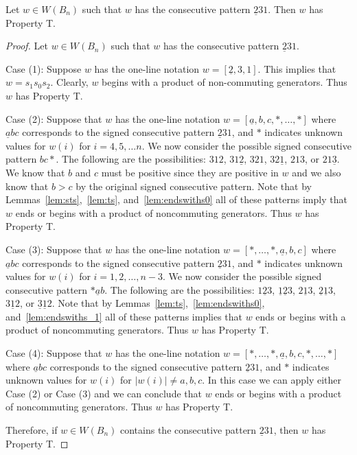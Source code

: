 \begin{lemma}\label{lem:231}
Let $w \in W(B_n)$ such that $w$ has the consecutive pattern $\underline{2}31$. Then $w$ has Property T.
\begin{proof}
	Let $w \in W(B_n)$ such that $w$ has the consecutive pattern $\underline{2}31$.
	
	Case (1): Suppose $w$ has the one-line notation $w=[\underline{2},3,1]$. This implies that $w=s_1s_0s_2$. Clearly, $w$ begins with a product of non-commuting generators. Thus $w$ has Property T.
	
	Case (2): Suppose that $w$ has the one-line notation $w=[\underline{a},b,c, \ast, \ldots, \ast]$ where $\underline{a}bc$ corresponds to the signed consecutive pattern $\underline{2}31$, and $\ast$ indicates unknown values for $w(i)$ for $i=4,5, \ldots n$. We now consider the possible signed consecutive pattern $bc \ast$. The following are the possibilities: $312$, $31\underline{2}$, $321$, $32\underline{1}$, $213$, or $21\underline{3}$. We know that $b$ and $c$ must be positive since they are positive in $w$ and we also know that $b>c$ by the original signed consecutive pattern. Note that by Lemmas~\ref{lem:sts},~\ref{lem:ts}, and~\ref{lem:endswiths0} all of these patterns imply that $w$ ends or begins with a product of noncommuting generators. Thus $w$ has Property T.
	
	Case (3): Suppose that $w$ has the one-line notation $w=[\ast, \ldots, \ast, \underline{a},b,c]$ where $\underline{a}bc$ corresponds to the signed consecutive pattern $\underline{2}31$, and $\ast$ indicates unknown values for $w(i)$ for $i=1,2, \ldots ,n-3$. We now consider the possible signed consecutive pattern $\ast \underline{a}b$. The following are the possibilities: $1 \underline{2} 3$, $\underline{1} \underline{2}3$, $2 \underline{1} 3$, $\underline{2} \underline{1} 3$, $3 \underline{1} 2$, or $\underline{3} \underline{1} 2$. Note that by Lemmas~\ref{lem:ts},~\ref{lem:endswiths0}, and~\ref{lem:endswiths_1} all of these patterns implies that $w$ ends or begins with a product of noncommuting generators. Thus $w$ has Property T. 
	
	Case (4): Suppose that $w$ has the one-line notation $w=[\ast, \ldots, \ast, \underline{a},b,c, \ast, \ldots, \ast]$ where $\underline{a}bc$ corresponds to the signed consecutive pattern $\underline{2}31$, and $\ast$ indicates unknown values for $w(i)$ for $|w(i)|\neq a,b,c$. In this case we can apply either Case (2) or Case (3) and we can conclude that $w$ ends or begins with a product of noncommuting generators. Thus $w$ has Property T.

	Therefore, if $w \in W(B_n)$ contains the consecutive pattern $\underline{2}31$, then $w$ has Property T.
\end{proof}	
\end{lemma}

